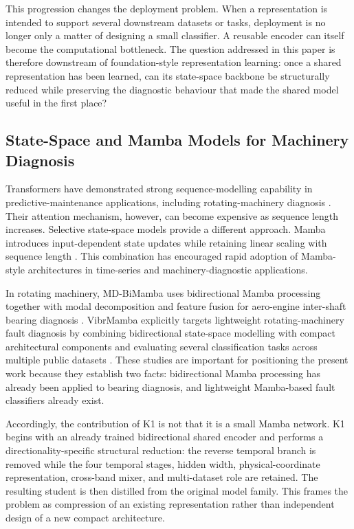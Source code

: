 This progression changes the deployment problem. When a representation is intended to support several downstream datasets or tasks, deployment is no longer only a matter of designing a small classifier. A reusable encoder can itself become the computational bottleneck. The question addressed in this paper is therefore downstream of foundation-style representation learning: once a shared representation has been learned, can its state-space backbone be structurally reduced while preserving the diagnostic behaviour that made the shared model useful in the first place?

\subsection{State-Space and Mamba Models for Machinery Diagnosis}
\label{subsec:mamba}

Transformers have demonstrated strong sequence-modelling capability in predictive-maintenance applications, including rotating-machinery diagnosis \citep{Nascimento2022T4PdM}. Their attention mechanism, however, can become expensive as sequence length increases. Selective state-space models provide a different approach. Mamba introduces input-dependent state updates while retaining linear scaling with sequence length \citep{Gu2023Mamba}. This combination has encouraged rapid adoption of Mamba-style architectures in time-series and machinery-diagnostic applications.

In rotating machinery, MD-BiMamba uses bidirectional Mamba processing together with modal decomposition and feature fusion for aero-engine inter-shaft bearing diagnosis \citep{Wang2025MDBiMamba}. VibrMamba explicitly targets lightweight rotating-machinery fault diagnosis by combining bidirectional state-space modelling with compact architectural components and evaluating several classification tasks across multiple public datasets \citep{Yi2025VibrMamba}. These studies are important for positioning the present work because they establish two facts: bidirectional Mamba processing has already been applied to bearing diagnosis, and lightweight Mamba-based fault classifiers already exist.

Accordingly, the contribution of K1 is not that it is a small Mamba network. K1 begins with an already trained bidirectional shared encoder and performs a directionality-specific structural reduction: the reverse temporal branch is removed while the four temporal stages, hidden width, physical-coordinate representation, cross-band mixer, and multi-dataset role are retained. The resulting student is then distilled from the original model family. This frames the problem as compression of an existing representation rather than independent design of a new compact architecture.

